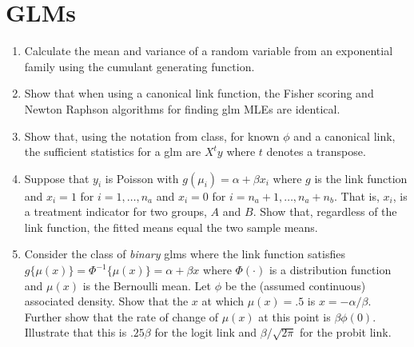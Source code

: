 \documentclass[12pt]{article}
\begin{document}
\section{GLMs}
\begin{enumerate}
\item Calculate the mean and variance of a random variable from an exponential family using the cumulant generating function.
\item Show that when using a canonical link function, the Fisher
  scoring and Newton Raphson algorithms for finding glm MLEs
  are identical.
\item Show that, using the notation from class, for known $\phi$ and a
  canonical link, the sufficient statistics for a glm are $X^t y$ where
  $t$ denotes a transpose.
\item Suppose that $y_i$ is Poisson with $g(\mu_i) = \alpha + \beta x_i$
  where $g$ is the link function and $x_i=1$ for $i=1,\ldots,n_a$ and
  $x_i=0$ for $i= n_a + 1, \ldots, n_a + n_b$. That is, $x_i$, is a treatment
  indicator for two groups, $A$ and $B$. Show that, regardless of the link
  function, the fitted means equal the two sample means.
 \item Consider the class of {\em binary} glms where the link function
  satisfies $g\{\mu(x)\} = \Phi^{-1}\{\mu(x)\} = \alpha + \beta x$
  where $\Phi(\cdot)$ is a distribution function and $\mu(x)$ is the
  Bernoulli mean. Let $\phi$ be the (assumed continuous) associated
  density. Show that the $x$ at which $\mu(x) = .5$ is
  $x=-\alpha/\beta$.  Further show that the rate of change of $\mu(x)$
  at this point is $\beta \phi(0)$. Illustrate that this is $.25\beta$
  for the logit link and $\beta / \sqrt{2\pi}$ for the probit link.
\end{enumerate}  
\end{document}
